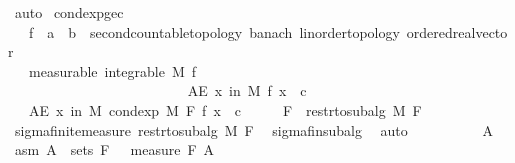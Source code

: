 \begin{isabellebody}
\ auto%
\endisatagproof
{\isafoldproof}%
%
\isadelimproof
\isanewline
%
\endisadelimproof
\isanewline
{}\isamarkupfalse%
\ cond{\isacharunderscore}{\kern0pt}exp{\isacharunderscore}{\kern0pt}ge{\isacharunderscore}{\kern0pt}c{\isacharcolon}{\kern0pt}\isanewline
\ \ \ f\ {\isacharcolon}{\kern0pt}{\isacharcolon}{\kern0pt}\ {\isachardoublequoteopen}{\isacharprime}{\kern0pt}a\ {\isasymRightarrow}\ {\isacharprime}{\kern0pt}b\ {\isacharcolon}{\kern0pt}{\isacharcolon}{\kern0pt}\ {\isacharbraceleft}{\kern0pt}second{\isacharunderscore}{\kern0pt}countable{\isacharunderscore}{\kern0pt}topology{\isacharcomma}{\kern0pt}\ banach{\isacharcomma}{\kern0pt}\ linorder{\isacharunderscore}{\kern0pt}topology{\isacharcomma}{\kern0pt}\ ordered{\isacharunderscore}{\kern0pt}real{\isacharunderscore}{\kern0pt}vector{\isacharbraceright}{\kern0pt}{\isachardoublequoteclose}\isanewline
\ \ \ {\isacharbrackleft}{\kern0pt}measurable{\isacharbrackright}{\kern0pt}{\isacharcolon}{\kern0pt}\ {\isachardoublequoteopen}integrable\ M\ f{\isachardoublequoteclose}\ \ \ \ \ \ \ \ \ \ \ \ \ \ \ \ \ \ \ \ \ \ \ \ \ \ \ \ \ \ \ \ \ \ \ \ \ \ \ \ \ \ \ \ \ \ \ \ \ \ \ \ \ \ \ \ \ \ \ \ \ \ \ \isanewline
\ \ \ \ \ \ \ {\isachardoublequoteopen}AE\ x\ in\ M{\isachardot}{\kern0pt}\ f\ x\ {\isasymge}\ c{\isachardoublequoteclose}\isanewline
\ \ \ {\isachardoublequoteopen}AE\ x\ in\ M{\isachardot}{\kern0pt}\ cond{\isacharunderscore}{\kern0pt}exp\ M\ F\ f\ x\ {\isasymge}\ c{\isachardoublequoteclose}\isanewline
%
\isadelimproof
%
\endisadelimproof
%
\isatagproof
{}\isamarkupfalse%
\ {\isacharminus}{\kern0pt}\isanewline
\ \ \isamarkupfalse%
\ {\isacharquery}{\kern0pt}F\ {\isacharequal}{\kern0pt}\ {\isachardoublequoteopen}restr{\isacharunderscore}{\kern0pt}to{\isacharunderscore}{\kern0pt}subalg\ M\ F{\isachardoublequoteclose}\isanewline
\ \ \isamarkupfalse%
\ sigma{\isacharunderscore}{\kern0pt}finite{\isacharunderscore}{\kern0pt}measure\ {\isachardoublequoteopen}restr{\isacharunderscore}{\kern0pt}to{\isacharunderscore}{\kern0pt}subalg\ M\ F{\isachardoublequoteclose}\ \isamarkupfalse%
\ sigma{\isacharunderscore}{\kern0pt}fin{\isacharunderscore}{\kern0pt}subalg\ \isamarkupfalse%
\ auto\isanewline
\ \ \isacommand{{\isacharbraceleft}{\kern0pt}}\isamarkupfalse%
\ \isanewline
\ \ \ \ \isamarkupfalse%
\ A\ \isamarkupfalse%
\ asm{\isacharcolon}{\kern0pt}\ {\isachardoublequoteopen}A\ {\isasymin}\ sets\ {\isacharquery}{\kern0pt}F{\isachardoublequoteclose}\ {\isachardoublequoteopen}{}\ {\isacharless}{\kern0pt}\ measure\ {\isacharquery}{\kern0pt}F\ A{\isachardoublequoteclose}\isanewline

\end{isabellebody}
